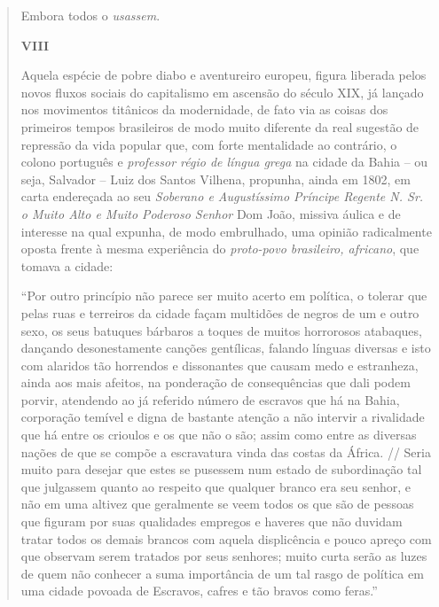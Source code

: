 \begin{quote}
Embora todos o \emph{usassem}.

\textbf{VIII}

Aquela espécie de pobre diabo e aventureiro europeu, figura liberada
pelos novos fluxos sociais do capitalismo em ascensão do século XIX, já
lançado nos movimentos titânicos da modernidade, de fato via as coisas
dos primeiros tempos brasileiros de modo muito diferente da real
sugestão de repressão da vida popular que, com forte mentalidade ao
contrário, o colono português e \emph{professor régio de língua grega}
na cidade da Bahia -- ou seja, Salvador -- Luiz dos Santos Vilhena,
propunha, ainda em 1802, em carta endereçada ao seu \emph{Soberano e
Augustíssimo Príncipe Regente N. Sr. o Muito Alto e Muito Poderoso
Senhor} Dom João, missiva áulica e de interesse na qual expunha, de modo
embrulhado, uma opinião radicalmente oposta frente à mesma experiência
do \emph{proto-povo brasileiro, africano}, que tomava a cidade:

``Por outro princípio não parece ser muito acerto em política, o tolerar
que pelas ruas e terreiros da cidade façam multidões de negros de um e
outro sexo, os seus batuques bárbaros a toques de muitos horrorosos
atabaques, dançando desonestamente canções gentílicas, falando línguas
diversas e isto com alaridos tão horrendos e dissonantes que causam medo
e estranheza, ainda aos mais afeitos, na ponderação de consequências que
dali podem porvir, atendendo ao já referido número de escravos que há na
Bahia, corporação temível e digna de bastante atenção a não intervir a
rivalidade que há entre os crioulos e os que não o são; assim como entre
as diversas nações de que se compõe a escravatura vinda das costas da
África. // Seria muito para desejar que estes se pusessem num estado de
subordinação tal que julgassem quanto ao respeito que qualquer branco
era seu senhor, e não em uma altivez que geralmente se veem todos os que
são de pessoas que figuram por suas qualidades empregos e haveres que
não duvidam tratar todos os demais brancos com aquela displicência e
pouco apreço com que observam serem tratados por seus senhores; muito
curta serão as luzes de quem não conhecer a suma importância de um tal
rasgo de política em uma cidade povoada de Escravos, cafres e tão bravos
como feras.''


\end{quote}
